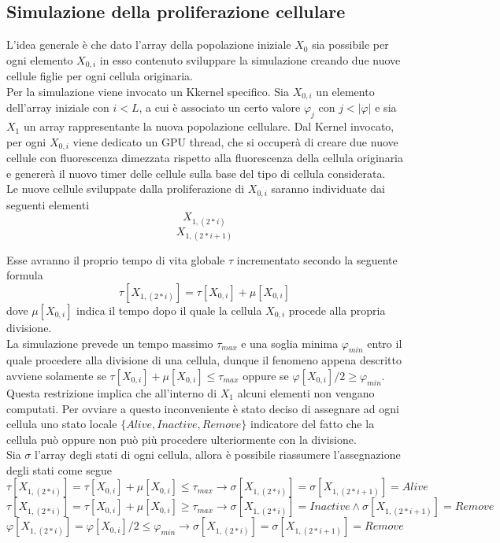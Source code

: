\subsection{Simulazione della proliferazione cellulare}

L'idea generale è che dato l'array della popolazione iniziale $X_{0}$
sia possibile per ogni elemento $X_{0,i}$ in esso contenuto sviluppare
la simulazione creando due nuove cellule figlie per ogni cellula originaria.
\\
Per la simulazione viene invocato un Kkernel specifico.
Sia $X_{0,i}$ un elemento dell'array iniziale
con $i < L$, a cui è associato un certo valore $\varphi_{j}$
con $j < |\varphi|$ e sia $X_{1}$ un array rappresentante la nuova
popolazione cellulare.
Dal Kernel invocato, per ogni $X_{0,i}$ viene dedicato un GPU thread,
che si occuperà di creare due nuove cellule con fluorescenza dimezzata
rispetto alla fluorescenza della cellula originaria e genererà
il nuovo timer delle cellule sulla base del tipo di cellula considerata.
\\
Le nuove cellule sviluppate dalla proliferazione
di $X_{0, i}$ saranno individuate dai seguenti elementi
$$X_{1, (2 * i)}$$ $$X_{1, (2 * i + 1)}$$

Esse avranno il proprio tempo di vita globale $\tau$
incrementato secondo la seguente formula
$$\tau[X_{1, (2 * i)}] = \tau[X_{0, i}] + \mu[X_{0, i}]$$
dove $\mu[X_{0, i}]$ indica il tempo dopo il quale la cellula $X_{0,i}$
procede alla propria divisione.
\\
La simulazione prevede un tempo massimo $\tau_{max}$ e una soglia minima
$\varphi_{min}$ entro il quale procedere
alla divisione di una cellula, dunque il fenomeno appena descritto avviene
solamente se $\tau[X_{0, i}] + \mu[X_{0, i}] \leqslant \tau_{max}$ oppure se
$\varphi[X_{0, i}] / 2 \geqslant \varphi_{min}$.
Questa restrizione implica che all'interno di $X_{1}$ alcuni elementi non
vengano computati. Per ovviare a questo inconveniente è stato deciso di
assegnare ad ogni cellula uno stato locale $\{Alive, Inactive, Remove\}$
indicatore del fatto che la cellula
può oppure non può più procedere ulteriormente con la divisione.
\\
Sia $\sigma$ l'array degli stati di ogni cellula, allora è possibile riassumere
l'assegnazione degli stati come segue
$$\tau[X_{1, (2 * i)}] = \tau[X_{0, i}] + \mu[X_{0, i}] \leqslant \tau_{max}
\longrightarrow \sigma[X_{1, (2 * i)}] = \sigma[X_{1, (2 * i + 1)}] = Alive$$
$$\tau[X_{1, (2 * i)}] = \tau[X_{0, i}] + \mu[X_{0, i}] \geqslant \tau_{max}
\longrightarrow \sigma[X_{1, (2 * i)}] = Inactive \land
\sigma[X_{1, (2 * i + 1)}] = Remove$$
$$\varphi[X_{1, (2 * i)}] = \varphi[X_{0, i}] / 2 \leqslant \varphi_{min}
\longrightarrow \sigma[X_{1, (2 * i)}] = \sigma[X_{1, (2 * i + 1)}] = Remove$$

